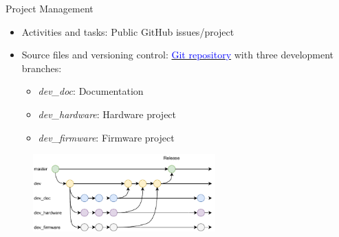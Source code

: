 %
%
%
%
%

%
%
%
%
%


\begin{frame}{Project Management}

    \begin{itemize}
        \item Activities and tasks: Public GitHub issues/project
        \vspace{0.25cm}
        \item Source files and versioning control: \href{https://github.com/spacelab-ufsc/obdh2}{\textcolor{blue}{Git repository}} with three development branches:
            \begin{itemize}
                \item \textit{dev\_doc}: Documentation
                \item \textit{dev\_hardware}: Hardware project
                \item \textit{dev\_firmware}: Firmware project
            \end{itemize}
    \end{itemize}

    \begin{figure}[!ht]
        \begin{center}
            \includegraphics[width=7cm]{figures/git-flow.pdf}
        \end{center}
    \end{figure}

\end{frame}